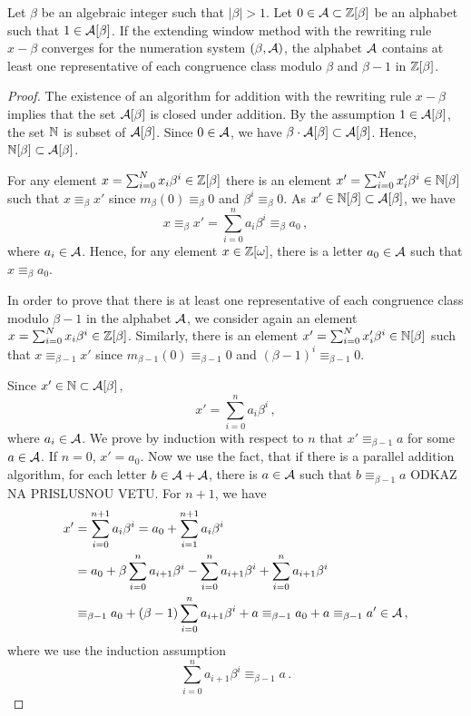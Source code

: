 \begin{theo}
Let $\beta$ be an algebraic integer such that $|\beta|>1$. Let $0\in \mathcal{A}\subset \mathbb{Z}[\beta]$ be an alphabet such that $1\in \mathcal{A}[\beta]$. If the extending window method with the rewriting rule $x-\beta$ converges for the numeration system $(\beta, \mathcal{A})$, the alphabet $\mathcal{A}$ contains at least one representative of each congruence class modulo $\beta$ and $\beta-1$ in $\mathbb{Z}[\beta]$. 
\end{theo}
\begin{proof}
The existence of an algorithm for addition with the rewriting rule $x-\beta$ implies that the set $\mathcal{A}[\beta]$ is closed under addition. By the assumption $1\in \mathcal{A}[\beta]$, the set $\mathbb{N}$ is subset of  $\mathcal{A}[\beta]$. Since $0\in\mathcal{A}$, we have $\beta \cdot \mathcal{A}[\beta] \subset \mathcal{A}[\beta]$. Hence, $\mathbb{N}[\beta] \subset \mathcal{A}[\beta]$.

For any element  $x=\sum_{i=0}^N x_i \beta^i\in \mathbb{Z}[\beta]$ there is an element $x'=\sum_{i=0}^N x'_i \beta^i\in \mathbb{N}[\beta]$ such that $x\equiv_\beta x'$  since $m_\beta (0)\equiv_\beta 0$ and $\beta^i\equiv_\beta 0$. As $x'\in \mathbb{N}[\beta] \subset \mathcal{A}[\beta]$, we have
$$
x\equiv_\beta x'=\sum_{i=0}^{n}a_i\beta^i \equiv_\beta a_0\,,
$$
where $a_i\in \mathcal{A}$. Hence, for any element $x\in\mathbb{Z}[\omega]$, there is a letter $a_0\in\mathcal{A}$ such that $x\equiv_\beta a_0$.

In order to prove that there is at least one representative of each congruence class modulo $\beta-1$ in the alphabet $\mathcal{A}$, we consider again an element $x=\sum_{i=0}^N x_i \beta^i\in \mathbb{Z}[\beta]$. Similarly, there is an element $x'=\sum_{i=0}^N x'_i \beta^i\in \mathbb{N}[\beta]$ such that $x\equiv_{\beta-1} x'$  since $m_{\beta-1} (0)\equiv_{\beta-1} 0$ and $(\beta-1)^i\equiv_{\beta-1} 0$.

Since $x'\in \mathbb{N}\subset \mathcal{A}[\beta]$,
$$
x'=\sum_{i=0}^{n}a_i\beta^i\,,
$$
where $a_i\in \mathcal{A}$. We prove by induction with respect to $n$ that $x'\equiv_{\beta-1} a$ for some $a\in\mathcal{A}$.
If $n=0$, $x'=a_0$. Now we use the fact, that if there is a parallel addition algorithm, for each letter $b \in\mathcal{A}+\mathcal{A}$, there is $a\in\mathcal{A}$ such that $b \equiv_{\beta-1} a$ ODKAZ NA PRISLUSNOU VETU. For $n+1$, we have
\begin{align*}
x'&=\sum_{i=0}^{n+1}a_i\beta^i =a_0 + \sum_{i=1}^{n+1}a_{i}\beta^i\\
    &=a_0 + \beta \sum_{i=0}^{n}a_{i+1}\beta^i - \sum_{i=0}^{n}a_{i+1}\beta^i+ \sum_{i=0}^{n}a_{i+1}\beta^i \\
    &\equiv_{\beta-1} a_0 + (\beta-1)\sum_{i=0}^{n}a_{i+1}\beta^i + a \equiv_{\beta-1}a_0 +a \equiv_{\beta-1}a' \in\mathcal{A}\,,
\end{align*}
where we use the induction assumption
$$
\sum_{i=0}^{n}a_{i+1}\beta^i\equiv_{\beta-1} a\,.
$$
\end{proof}



